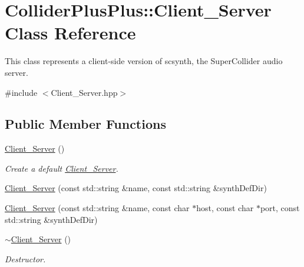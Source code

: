 \hypertarget{classColliderPlusPlus_1_1Client__Server}{\section{Collider\-Plus\-Plus\-:\-:Client\-\_\-\-Server Class Reference}
\label{classColliderPlusPlus_1_1Client__Server}
}


This class represents a client-\/side version of scsynth, the Super\-Collider audio server.  




{\ttfamily \#include $<$Client\-\_\-\-Server.\-hpp$>$}

\subsection*{Public Member Functions}
\begin{DoxyCompactItemize}
\item 
\hypertarget{classColliderPlusPlus_1_1Client__Server_aa179711b3f9a10b86e95bf99bdc2718c}{\hyperlink{classColliderPlusPlus_1_1Client__Server_aa179711b3f9a10b86e95bf99bdc2718c}{Client\-\_\-\-Server} ()}\label{classColliderPlusPlus_1_1Client__Server_aa179711b3f9a10b86e95bf99bdc2718c}

\begin{DoxyCompactList}\small\item\em Create a default \hyperlink{classColliderPlusPlus_1_1Client__Server}{Client\-\_\-\-Server}. \end{DoxyCompactList}\item 
\hyperlink{classColliderPlusPlus_1_1Client__Server_a1b3c915afa0f93cc1c58f11d19f81df7}{Client\-\_\-\-Server} (const std\-::string \&name, const std\-::string \&synth\-Def\-Dir)
\item 
\hyperlink{classColliderPlusPlus_1_1Client__Server_a04d0177e0c05ab03825c9820fedea3d7}{Client\-\_\-\-Server} (const std\-::string \&name, const char $\ast$host, const char $\ast$port, const std\-::string \&synth\-Def\-Dir)
\item 
\hypertarget{classColliderPlusPlus_1_1Client__Server_a462cbd7e74b2c5f5073865e29d528505}{\hyperlink{classColliderPlusPlus_1_1Client__Server_a462cbd7e74b2c5f5073865e29d528505}{$\sim$\-Client\-\_\-\-Server} ()}\label{classColliderPlusPlus_1_1Client__Server_a462cbd7e74b2c5f5073865e29d528505}

\begin{DoxyCompactList}\small\item\em Destructor. \end{DoxyCompactList}\end{DoxyCompactItemize}
